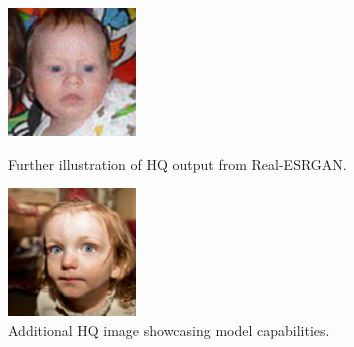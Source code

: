 \begin{figure}[htbp]
    \centering
    \begin{minipage}{0.45\textwidth}
        \centering
        \includegraphics[width=\textwidth]{imgs/00328.png}
        \caption{Further illustration of HQ output from Real-ESRGAN.}
        \label{fig:image3}
    \end{minipage}\hfill
    \begin{minipage}{0.45\textwidth}
        \centering
        \includegraphics[width=\textwidth]{imgs/00386.png}
        \caption{Additional HQ image showcasing model capabilities.}
        \label{fig:image4}
    \end{minipage}
\end{figure}

